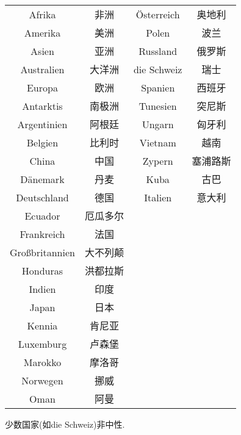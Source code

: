 \documentclass[hidelinks]{ctexart}
\begin{document}
\begin{longtable}{cccc}
    Afrika & 非洲 & \"Osterreich & 奥地利\\
    Amerika & 美洲 & Polen & 波兰\\
    Asien & 亚洲 & Russland & 俄罗斯\\
    Australien & 大洋洲 & die Schweiz & 瑞士\\
    Europa & 欧洲 & Spanien & 西班牙\\
    Antarktis & 南极洲 & Tunesien & 突尼斯\\
    Argentinien & 阿根廷 & Ungarn & 匈牙利\\
    Belgien & 比利时 & Vietnam & 越南\\
    China & 中国 & Zypern & 塞浦路斯 \\
    D\"anemark & 丹麦 & Kuba & 古巴\\
    Deutschland & 德国 & Italien & 意大利\\
    Ecuador & 厄瓜多尔\\
    Frankreich & 法国\\
    Gro\ss britannien & 大不列颠\\
    Honduras & 洪都拉斯\\
    Indien & 印度\\
    Japan & 日本\\
    Kennia & 肯尼亚\\
    Luxemburg & 卢森堡\\
    Marokko & 摩洛哥\\
    Norwegen & 挪威\\
    Oman & 阿曼\\
\end{longtable}
\begin{finale}
    少数国家(如die Schweiz)非中性.
\end{finale}
\end{document}
